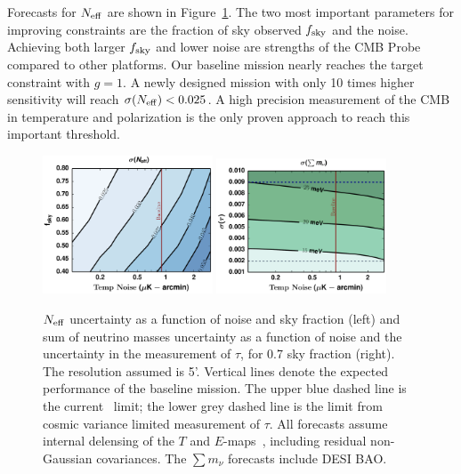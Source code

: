 Forecasts for ${N_{\rm eff}}$ are shown in Figure~\ref{fig:Neff_future}.  The two most important parameters for improving constraints
are the fraction of sky observed $f_{\rm sky}$ and the noise. Achieving both larger $f_{\rm sky}$ and
lower noise are strengths of the CMB Probe compared to other platforms. 
Our baseline mission nearly reaches the target constraint with $g=1$. 
A newly designed mission with only 10 times higher sensitivity will reach $\sigma({N_{\rm eff}}) < 0.025$.  A high precision measurement of the 
CMB in temperature and polarization is the only proven approach to reach this important threshold.  

\begin{figure}[t!]
\begin{center}
\includegraphics[width=0.45\textwidth]{figs/Neff_log.pdf}
\includegraphics[width=0.45\textwidth]{figs/Mnu_tauprior_log.pdf}
\vspace{-0.15in}
\caption{ \small \setlength{\baselineskip}{0.95\baselineskip}
${N_{\rm eff}}$ uncertainty as a function of noise and sky fraction (left) and sum of 
neutrino masses uncertainty as a function of noise and the uncertainty in the measurement of $\tau$, 
for 0.7 sky fraction (right). The resolution assumed is 5'.  
Vertical lines denote the expected performance of the baseline mission. 
The upper blue dashed line is the current \planck~limit; the lower grey dashed line is the limit from cosmic variance 
limited measurement of $\tau$. All forecasts assume internal delensing of the $T$ and $E$-maps~\cite{Green:2016cjr}, 
including residual non-Gaussian covariances.  The $\sum m_\nu$ forecasts include DESI BAO.  
\label{fig:Neff_future} }
\end{center}
\vspace{-0.15in}
\end{figure}

